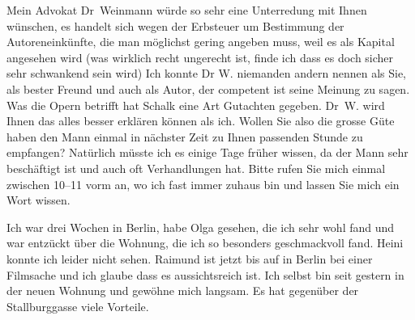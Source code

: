 \pstart
           Mein Advokat Dr Weinmann würde so sehr eine
               Unterredung mit Ihnen wünschen, es handelt sich wegen der Erbsteuer um Bestimmung der
               Autoreneinkünfte, die man möglichst gering angeben muss, weil es als Kapital
               angesehen wird (was wirklich recht ungerecht ist, finde ich dass es doch sicher sehr
               schwankend sein wird) Ich konnte Dr W.
               niemanden andern nennen als Sie, als bester Freund und auch als Autor, der competent
               ist seine Meinung zu sagen. Was die Opern betrifft hat Schalk eine Art Gutachten gegeben. Dr W. wird Ihnen das alles besser erklären können als ich.
               Wollen Sie also die grosse Güte haben den Mann einmal in nächster Zeit zu \label{T_L02535-1v}\label{T_L02535-1} Ihnen passenden
               Stunde zu empfangen? Natürlich müsste ich es einige Tage früher wissen, da der Mann sehr beschäftigt ist und auch oft
               Verhandlungen hat. Bitte rufen Sie mich einmal zwischen 10–11 vorm an,
               wo ich fast immer zuhaus bin und lassen Sie mich ein Wort wissen.\pend
           
\pstart
           Ich war drei Wochen in Berlin, habe Olga gesehen, die ich sehr wohl fand und war
               entzückt über die Wohnung, die ich so besonders geschmackvoll fand. Heini konnte ich leider nicht sehen. Raimund ist jetzt bis auf \label{T_L02535-2v}\label{T_L02535-2} in Berlin bei einer Filmsache und ich glaube dass es aussichtsreich ist. Ich
               selbst bin seit gestern in der neuen Wohnung und gewöhne mich langsam. Es hat
               gegenüber der Stallburggasse viele
               Vorteile.\pend
           
